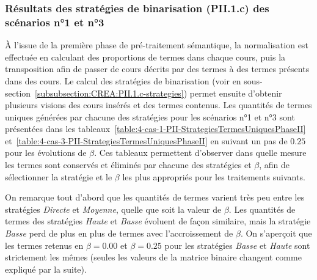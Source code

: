 

\bigskip




\subsubsection{Résultats des stratégies de binarisation (PII.1.c) des scénarios n°1 et n°3}
\label{subsubsection:Evaluation:DeroulementExperimentations:ValidationStructurelle:ResultatsStrategiesBinarisationS1S3}

À l'issue de la première phase de pré-traitement sémantique, la normalisation est effectuée en calculant des proportions de termes dans chaque cours, puis la transposition afin de passer de cours décrits par des termes à des termes présents dans des cours.
Le calcul des stratégies de binarisation (voir en sous-section~\ref{subsubsection:CREA:PII.1.c-strategies}) permet ensuite d'obtenir plusieurs visions des cours insérés et des termes contenus.
Les quantités de termes uniques générées par chacune des stratégies pour les scénarios n°1 et n°3 sont présentées dans les tableaux~\ref{table:4-cas-1-PII-StrategiesTermesUniquesPhaseII} et~\ref{table:4-cas-3-PII-StrategiesTermesUniquesPhaseII} en suivant un pas de $ 0.25 $ pour les évolutions de $ \beta $.
Ces tableaux permettent d'observer dans quelle mesure les termes sont conservés et éliminés par chacune des stratégies et $ \beta $, afin de sélectionner la stratégie et le $ \beta $ les plus appropriés pour les traitements suivants.

\bigskip

On remarque tout d'abord que les quantités de termes varient très peu entre les stratégies \textit{Directe} et \textit{Moyenne}, quelle que soit la valeur de $ \beta $.
Les quantités de termes des stratégies \textit{Haute} et \textit{Basse} évoluent de façon similaire, mais la stratégie \textit{Basse} perd de plus en plus de termes avec l'accroissement de $ \beta $.
On s'aperçoit que les termes retenus en $ \beta = 0.00 $ et $ \beta = 0.25 $ pour les stratégies \textit{Basse} et \textit{Haute} sont strictement les mêmes (seules les valeurs de la matrice binaire changent comme expliqué par la suite).


